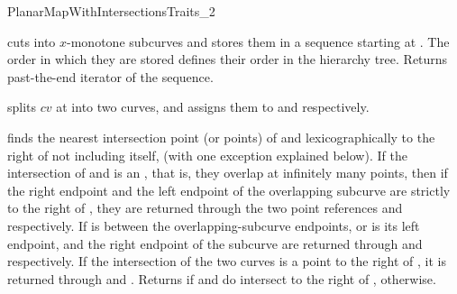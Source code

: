 \begin{ccRefConcept}{PlanarMapWithIntersectionsTraits_2}

	 {cuts  into $x$-monotone subcurves and stores them in a
	   sequence starting at . The order in which they are stored
	   defines their order in the hierarchy tree. Returns past-the-end
	   iterator of the sequence.}

         {splits $cv$ at  into two curves, and assigns them to
            and  respectively.
           }

	 {finds the nearest intersection point (or points) of  and
	    lexicographically to the right of  not including
	    itself, (with one exception explained below).
	   If the intersection of  and  is an
	   , that is, they overlap at infinitely many
	   points, then if the right endpoint and the left endpoint of the
	   overlapping subcurve are strictly to the right of , they are
	   returned through the two point references  and 
	   respectively. If  is between the overlapping-subcurve
	   endpoints, or  is its left endpoint,  and the right
	   endpoint of the subcurve are returned through  and 
	   respectively. If the intersection of the two curves is a point to the
	   right of , it is returned through  and .
	   Returns  if  and  do intersect to the right
	   of ,  otherwise.}


\end{ccRefConcept}

